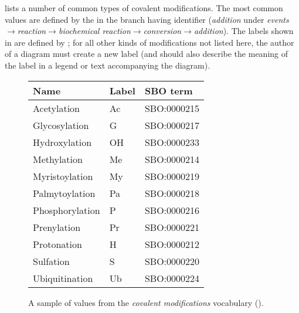  lists a number of common types of covalent modifications.  The most common values are defined by the \sbo in the branch having identifier  (\emph{addition} under \emph{events}$\rightarrow$\emph{reaction}$\rightarrow$\emph{biochemical reaction}$\rightarrow$\emph{conversion}$\rightarrow$\emph{addition}).  The labels shown in  are defined by \SBGNERLone; for all other kinds of modifications not listed here, the author of a \ER diagram must create a new label (and should also describe the meaning of the label in a legend or text accompanying the diagram).

\begin{figure}[h]
  \centering
  \begin{tabular}{l>{\ttfamily}ll}
    \toprule
    \textbf{Name}   & \textbf{\rmfamily Label} & \textbf{SBO term} \\
    \midrule
    Acetylation     & Ac    & SBO:0000215\\
    Glycosylation   & G     & SBO:0000217\\
    Hydroxylation   & OH    & SBO:0000233\\
    Methylation     & Me    & SBO:0000214\\
    Myristoylation  & My    & SBO:0000219\\
    Palmytoylation  & Pa    & SBO:0000218\\
    Phosphorylation & P     & SBO:0000216\\
    Prenylation     & Pr    & SBO:0000221\\
    Protonation     & H     & SBO:0000212\\
    Sulfation       & S     & SBO:0000220\\
    Ubiquitination  & Ub    & SBO:0000224\\
    \bottomrule
  \end{tabular}
  \caption{A sample of values from the \emph{covalent modifications} vocabulary
    ().}
  \label{fig:covalent-mod-cv}
\end{figure}
 \normalcolor
